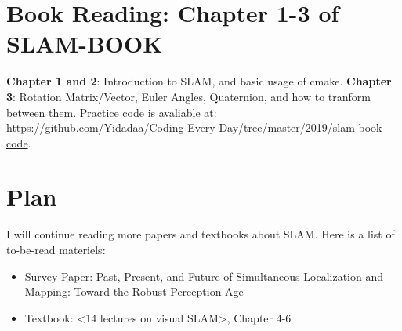 \documentclass{article}
\begin{document}
    \section{Book Reading: Chapter 1-3 of SLAM-BOOK}
    \textbf{Chapter 1 and 2}: Introduction to SLAM, and basic usage of cmake. \textbf{Chapter 3}: Rotation Matrix/Vector, Euler Angles, Quaternion, and how to tranform between them. Practice code is avaliable at: \url{https://github.com/Yidadaa/Coding-Every-Day/tree/master/2019/slam-book-code}.

    \section{Plan}
    I will continue reading more papers and textbooks about SLAM. Here is a list of to-be-read materiels:
    \begin{itemize}
        \item Survey Paper: Past, Present, and Future of Simultaneous Localization and Mapping: Toward the Robust-Perception Age
        \item Textbook: <14 lectures on visual SLAM>, Chapter 4-6
    \end{itemize}
    
\end{document}
